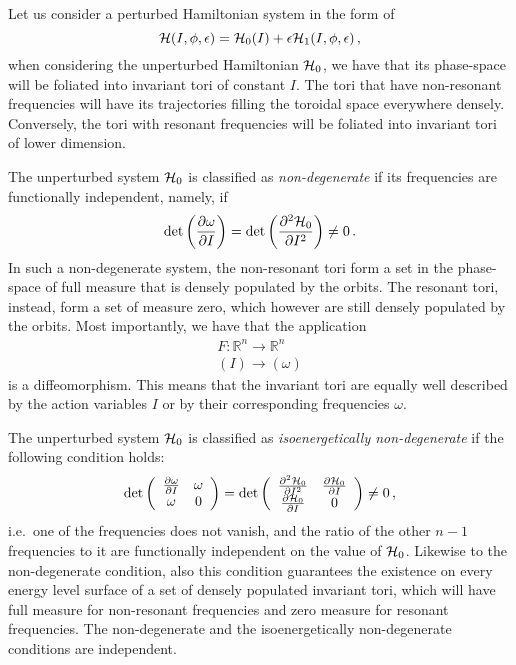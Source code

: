 Let us consider a perturbed Hamiltonian system in the form of
\begin{equation}
    \mathcal{H}(I, \phi, \epsilon) = \mathcal{H}_0(I) + \epsilon\mathcal{H}_1(I,\phi,\epsilon)\,,
    \label{eq:1:hamperturbed}
\end{equation}
when considering the unperturbed Hamiltonian $\mathcal{H}_0$, we have that its phase-space will be foliated into invariant tori of constant $I$. The tori that have non-resonant frequencies will have its trajectories filling the toroidal space everywhere densely. Conversely, the tori with resonant frequencies will be foliated into invariant tori of lower dimension.

The unperturbed system $\mathcal{H}_0$ is classified as \textit{non-degenerate} if its frequencies are functionally independent, namely, if
\begin{equation}
    \det\left(\pdv{\omega}{I}\right) = \det\left(\pdv[2]{\mathcal{H}_0}{I}\right) \neq 0 \,.
\end{equation}
In such a non-degenerate system, the non-resonant tori form a set in the phase-space of full measure that is densely populated by the orbits. The resonant tori, instead, form a set of measure zero, which however are still densely populated by the orbits. Most importantly, we have that the application
\begin{equation}
    \begin{array}{r}
    F: \mathbb{R}^{n} \longrightarrow \mathbb{R}^n \\
    (I) \longrightarrow(\omega)
    \end{array}
\end{equation}
is a diffeomorphism. This means that the invariant tori are equally well described by the action variables $I$ or by their corresponding frequencies $\omega$.

The unperturbed system $\mathcal{H}_0$ is classified as \textit{isoenergetically non-degenerate} if the following condition holds:
\begin{equation}
    \operatorname{det}\left(\begin{array}{cc}
    \frac{\partial \omega}{\partial I} & \omega \\
    \omega & 0
    \end{array}\right)=\operatorname{det}\left(\begin{array}{cc}
    \frac{\partial^2 \mathcal{H}_0}{\partial I^2} & \frac{\partial \mathcal{H}_0}{\partial I} \\
    \frac{\partial \mathcal{H}_0}{\partial I} & 0
    \end{array}\right) \neq 0 \,,
\end{equation}
i.e.\ one of the frequencies does not vanish, and the ratio of the other $n-1$ frequencies to it are functionally independent on the value of $\mathcal{H}_0$. Likewise to the non-degenerate condition, also this condition guarantees the existence on every energy level surface of a set of densely populated invariant tori, which will have full measure for non-resonant frequencies and zero measure for resonant frequencies. The non-degenerate and the isoenergetically non-degenerate conditions are independent.

